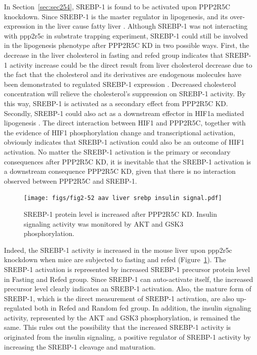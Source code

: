 In Section~\ref{sec:sec254}, SREBP-1 is found to be activated upon PPP2R5C knockdown. Since SREBP-1 is the master regulator in lipogenesis, and its over-expression in the liver cause fatty liver \cite{horton_srebps:_2002}. Although SREBP-1 was not interacting with \gls{ppp2r5c} in substrate trapping experiment, SREBP-1 could still be involved in the lipogenesis phenotype after PPP2R5C KD in two possible ways. First, the decrease in the liver cholesterol in fasting and refed group indicates that SREBP-1 activity increase could be the direct result from liver cholesterol decrease due to the fact that the cholesterol and its derivatives are endogenous molecules have been demonstrated to regulated SREBP-1 expression \cite{amemiya-kudo_transcriptional_2002,wang_srebp-1_1994}. Decreased cholesterol concentration will relieve the cholesterol's suppression on SREBP-1 activity.  By this way, SREBP-1 is activated as a secondary effect from PPP2R5C KD. Secondly, SREBP-1 could also act as a downstream effector in \gls{HIF1a} mediated lipogenesis \cite{li_altered_2006}. The direct interaction between HIF1\textalpha{} and PPP2R5C, together with the evidence of HIF1\textalpha{} phosphorylation change and transcriptional activation, obviously indicates that SREBP-1 activation could also be an outcome of HIF1\textalpha{} activation. No matter the SREBP-1 activation is the primary or secondary consequences after PPP2R5C KD, it is inevitable that the SREBP-1 activation is a downstream consequence PPP2R5C KD, given that there is no interaction observed between PPP2R5C and SREBP-1. 

\begin{figure}[!t]
\centering
\texttt{[image: figs/fig2-52 aav liver srebp insulin signal.pdf]}
\caption[SREBP-1 protein increases upon PPP2R5C KD]{\footnotesize SREBP-1 protein level is increased after PPP2R5C KD. Insulin signaling activity was monitored by AKT and GSK3\textbeta{} phosphorylation.}
\label{fig:fig2.52}
\end{figure}

Indeed, the SREBP-1 activity is increased in the mouse liver upon \gls{ppp2r5c} knockdown when mice are subjected to fasting and refed (Figure~\ref{fig:fig2.52}). The SREBP-1 activation is represented by increased SREBP-1 precursor protein level in Fasting and Refed group. Since SREBP-1 can auto-activate itself, the increased precursor level clearly indicates an SREBP-1 activation. Also, the mature form of SREBP-1, which is the direct measurement of SREBP-1 activation, are also up-regulated both in Refed and Random fed group. In addition, the insulin signaling activity, represented by the AKT and GSK3\textbeta{} phosphorylation, is remained the same. This rules out the possibility that the increased SREBP-1 activity is originated from the insulin signaling, a positive regulator of SREBP-1 activity by increasing the SREBP-1 cleavage and maturation. 


